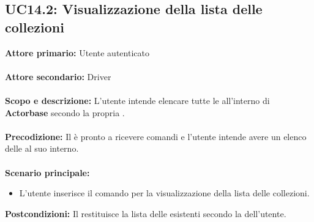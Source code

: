 \documentclass{scalatekids-article}
\begin{document}
\subsection{UC14.2: Visualizzazione della lista delle collezioni}

\textbf{Attore primario:} Utente autenticato\\ \\
\textbf{Attore secondario:} Driver\\ \\
\textbf{Scopo e descrizione:} L'utente intende elencare tutte le  all'interno di \textbf{Actorbase} secondo la propria .\\ \\
\textbf{Precodizione:} Il  è pronto a ricevere comandi e l'utente intende avere un elenco delle  al suo interno.\\ \\
\textbf{Scenario principale:}
\begin{itemize}
\item L'utente inserisce il comando per la visualizzazione della lista delle collezioni.
\end{itemize}
\textbf{Postcondizioni:} Il  restituisce la lista delle  esistenti secondo la  dell'utente.
\end{document}
